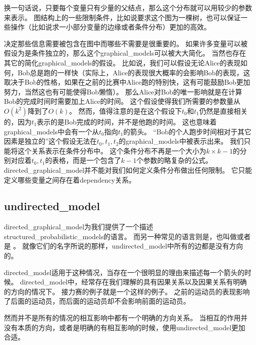 换一句话说，只要每个变量只有少量的父结点，那么这个分布就可以用较少的参数来表示。
图结构上的一些限制条件，比如说要求这个图为一棵树，也可以保证一些操作（比如说求一小部分变量的边缘或者条件分布）更加的高效。



决定那些信息需要被包含在图中而哪些不需要是很重要的。
如果许多变量可以被假设为是条件独立的，那么这个\gls{graphical_models}可以被大大简化。
当然也存在其它的简化\gls{graphical_models}的假设。
比如说，我们可以假设无论Alice的表现如何，Bob总是跑的一样快（实际上，Alice的表现很大概率的会影响Bob的表现，这取决于Bob的性格，如果在之前的比赛中Alice跑的特别快，这有可能鼓励Bob更加努力，当然这也有可能使得Bob懒惰）。
那么Alice对Bob的唯一影响就是在计算Bob的完成时间时需要加上Alice的时间。
这个假设使得我们所需要的参数量从$O(k^2)$降到了$O(k)$。
然而，值得注意的是在这个假设下$t_0$和$t_1$仍然是直接相关的，因为$t_1$表示的是Bob完成的时间，并不是他跑的时间。
这也意味着\gls{graphical_models}中会有一个从$t_0$指向$t_1$的箭头。
``Bob的个人跑步时间相对于其它因素是独立的''这个假设无法在$t_0,t_1,t_2$的\gls{graphical_models}中被表示出来。
我们只能将这个关系表示在条件分布中。
这个条件分布不再是一个大小为$k\times k-1$的分别对应着$t_0, t_1$的表格，而是一个包含了$k-1$个参数的略复杂的公式。
\gls{directed_graphical_model}并不能对我们如何定义条件分布做出任何限制。
它只能定义哪些变量之间存在着\gls{dependency}关系。



\subsection{\gls{undirected_model}}
\label{sec:undirected_models}


\gls{directed_graphical_model}为我们提供了一个描述\gls{structured_probabilistic_models}的语言。
而另一种常见的语言则是，也叫做或者是 \citep{kindermann-book-1980}。
就像它们的名字所说的那样，\gls{undirected_model}中所有的边都是没有方向的。


\gls{directed_model}适用于这种情况，当存在一个很明显的理由来描述每一个箭头的时候。
\gls{directed_model}中，经常存在我们理解的具有因果关系以及因果关系有明确的方向的情况下。
接力赛的例子就是一个这样的例子。
之前的运动员的表现影响了后面的运动员，而后面的运动员却不会影响前面的运动员。


然而并不是所有的情况的相互影响中都有一个明确的方向关系。
当相互的作用并没有本质的方向，或者是明确的有相互影响的时候，使用\gls{undirected_model}更加合适。


